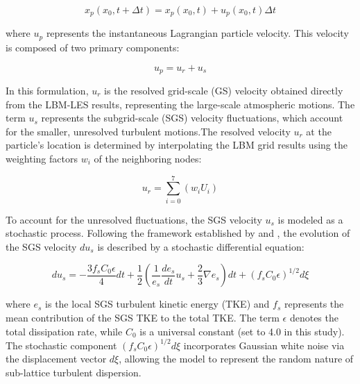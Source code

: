 \begin{equation}
    x_p(x_0, t + \Delta t) = x_p(x_0, t) + u_p(x_0, t)\Delta t    
\end{equation}

where $u_p$ represents the instantaneous Lagrangian particle velocity. This velocity is composed of two primary components: 

\begin{equation}
    u_p = u_r + u_s    
\end{equation} 

In this formulation, $u_r$ is the resolved grid-scale (GS) velocity obtained directly from the LBM-LES results, representing the large-scale atmospheric motions. The term $u_s$ represents the subgrid-scale (SGS) velocity fluctuations, which account for the smaller, unresolved turbulent motions.The resolved velocity $u_r$ at the particle's location is determined by interpolating the LBM grid results using the weighting factors $w_i$ of the neighboring nodes: 

\begin{equation}
    u_r = \sum_{i=0}^7(w_i U_i)  
\end{equation}

To account for the unresolved fluctuations, the SGS velocity $u_s$ is modeled as a stochastic process. Following the framework established by \textcite{Weil2024LSM} and \textcite{Thomson1987Stochastic}, the evolution of the SGS velocity $du_s$ is described by a stochastic differential equation: 

\begin{equation}
    du_s = -\frac{3f_sC_0\epsilon}{4}dt + \frac{1}{2}\left( \frac{1}{e_s}\frac{de_s}{dt}u_s + \frac{2}{3}\nabla e_s \right)dt + (f_sC_0\epsilon)^{1/2}d\xi
\end{equation}

where $e_s$ is the local SGS turbulent kinetic energy (TKE) and $f_s$ represents the mean contribution of the SGS TKE to the total TKE. The term $\epsilon$ denotes the total dissipation rate, while $C_0$ is a universal constant (set to 4.0 in this study). The stochastic component $(f_sC_0\epsilon)^{1/2}d\xi$ incorporates Gaussian white noise via the displacement vector $d\xi$, allowing the model to represent the random nature of sub-lattice turbulent dispersion.

